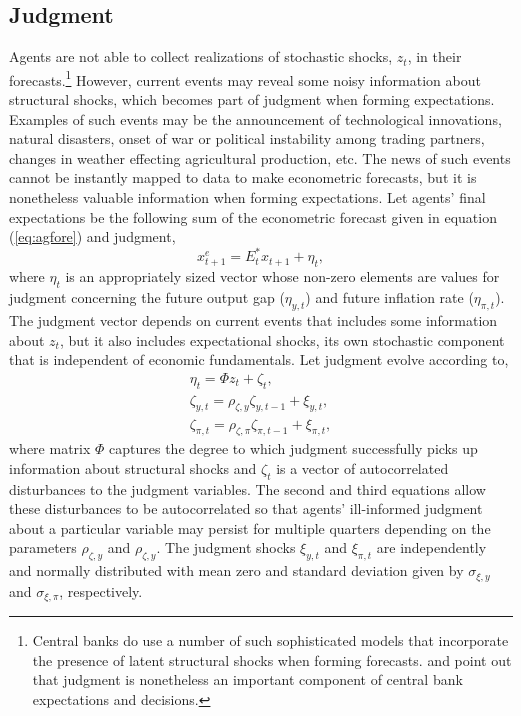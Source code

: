 \documentclass[12pt]{article}
\newcommand{\beq}{\begin{equation}}
\newcommand{\eeq}{\end{equation}}
\newcommand{\citee}[1]{\citet{#1}}
\newcommand{\ds}{\displaystyle}
\begin{document}
\subsection{Judgment}
Agents are not able to collect realizations of stochastic shocks, $z_t$, in their forecasts.\footnote{Central banks do use a number of such sophisticated models that incorporate the presence of latent structural shocks when forming forecasts.  \citee{rsw1997} and \citee{svensson2005} point out that judgment is nonetheless an important component of central bank expectations and decisions.}  However, current events may reveal some noisy information about structural shocks, which becomes part of judgment when forming expectations.  Examples of such events may be the announcement of technological innovations, natural disasters, onset of war or political instability among trading partners, changes in weather effecting agricultural production, etc.  The news of such events cannot be instantly mapped to data to make econometric forecasts, but it is nonetheless valuable information when forming expectations.  Let agents' final expectations be the following sum of the econometric forecast given in equation (\ref{eq:agfore}) and judgment,
\beq x_{t+1}^e = E_t^* x_{t+1} + \eta_{t}, \eeq
where $\eta_t$ is an appropriately sized vector whose non-zero elements are values for judgment concerning the future output gap ($\eta_{y,t}$) and future inflation rate ($\eta_{\pi,t}$).  The judgment vector depends on current events that includes some information about $z_t$, but it also includes expectational shocks, its own stochastic component that is independent of economic fundamentals.  Let judgment evolve according to,
\beq \label{eq:news} \begin{array}{c} \ds \eta_t = \Phi z_t + \zeta_t, \\ [1pc]
 \ds \zeta_{y,t} = \rho_{\zeta,y} \zeta_{y,t-1} + \xi_{y,t}, \\ [1pc]
 \ds \zeta_{\pi,t} = \rho_{\zeta,\pi} \zeta_{\pi,t-1} + \xi_{\pi,t},
\end{array} \eeq
where matrix $\Phi$ captures the degree to which judgment successfully picks up information about structural shocks and $\zeta_t$ is a vector of autocorrelated disturbances to the judgment variables.  The second and third equations allow these disturbances to be autocorrelated so that agents' ill-informed judgment about a particular variable may persist for multiple quarters depending on the parameters $\rho_{\zeta,y}$ and $\rho_{\zeta,y}$.  The judgment shocks $\xi_{y,t}$ and $\xi_{\pi,t}$ are independently and normally distributed with mean zero and standard deviation given by $\sigma_{\xi,y}$ and $\sigma_{\xi,\pi}$, respectively.  
\end{document}
